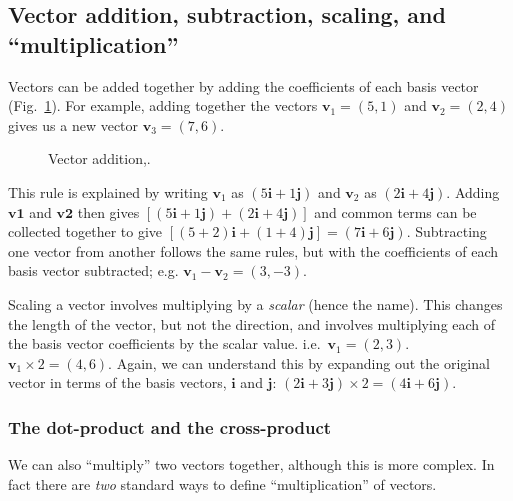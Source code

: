 \documentclass[a4paper]{article}
\renewcommand{\vec}[1]{\mathbf{#1}}
\begin{document}
\subsection{Vector addition, subtraction, scaling, and ``multiplication''}
Vectors can be added together by adding the coefficients of each basis vector (Fig.~\ref{fig:vector_addition}). For example, adding together the vectors $\vec{v}_1=(5,1)$ and $\vec{v}_2=(2,4)$ gives us a new vector $\vec{v}_3=(7,6)$. \begin{figure}[htb]
  \centering
    \caption{\label{fig:vector_addition}Vector addition,.}
\end{figure}
This rule is explained by writing $\vec{v}_1$ as $(5\vec{i}+1\vec{j})$ and $\vec{v}_2$ as $(2\vec{i}+4\vec{j})$. Adding $\vec{v1}$ and $\vec{v2}$ then gives $\left[(5\vec{i}+1\vec{j})+(2\vec{i}+4\vec{j})\right]$ and common terms can be collected together to give $\left[(5+2)\vec{i}+(1+4)\vec{j}\right]=(7\vec{i}+6\vec{j})$. Subtracting one vector from another follows the same rules, but with the coefficients of each basis vector subtracted; e.g. $\vec{v}_1-\vec{v}_2=(3,-3)$. 

Scaling a vector involves multiplying by a \emph{scalar} (hence the name). This changes the length of the vector, but not the direction, and involves multiplying each of the basis vector coefficients by the scalar value. i.e.~$\vec{v}_\mathrm{1}=(2,3)$. $\vec{v}_1\times2=(4,6)$. Again, we can understand this by expanding out the original vector in terms of the basis vectors, $\vec{i}$ and $\vec{j}$: $(2\vec{i}+3\vec{j})\times2=(4\vec{i}+6\vec{j})$.

\subsubsection{The dot-product and the cross-product}
We can also ``multiply'' two vectors together, although this is more complex. In fact there are \emph{two} standard ways to define ``multiplication'' of vectors.
\end{document}
